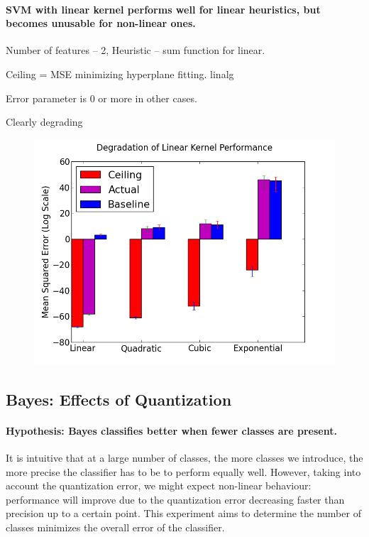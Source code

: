 \documentclass[12pt,notitlepage,twoside]{scrreprt}
\begin{document}
\paragraph{SVM with linear kernel performs well for linear heuristics, but becomes
unusable for non-linear ones.}

Number of features -- 2, Heuristic -- sum function for linear.

Ceiling = MSE minimizing hyperplane fitting. linalg

Error parameter is 0 or more in other cases.

Clearly degrading

\begin{figure}[h!]
\centering
  \includegraphics[width=\linewidth]{figs/lin_degrad.png}
  \caption{}
  \label{lin_degrad}
\end{figure}


\subsection{Bayes: Effects of Quantization}
\paragraph{Hypothesis: Bayes classifies better when fewer classes are present.}
It is intuitive that at a large number of classes, the more classes we introduce, the more precise the classifier has to be to perform
equally well. However, taking into account the quantization error, we might expect
non-linear behaviour: performance will improve due to the quantization error decreasing
faster than precision up to a certain point. This experiment aims to determine the number
of classes minimizes the overall error of the classifier.
\end{document}

